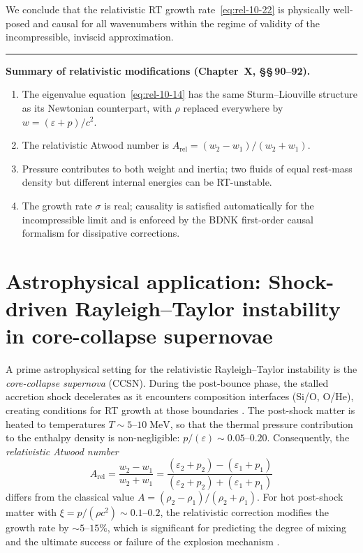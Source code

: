 We conclude that the relativistic RT growth rate~\eqref{eq:rel-10-22} is
physically well-posed and causal for all wavenumbers within the regime
of validity of the incompressible, inviscid approximation.


\begin{center}
\rule{0.5\textwidth}{0.4pt}
\end{center}

\noindent\textbf{Summary of relativistic modifications
(Chapter~X, \S\S\,90--92).}
\begin{enumerate}
\item The eigenvalue equation~\eqref{eq:rel-10-14} has the same
  Sturm--Liouville structure as its Newtonian counterpart, with $\rho$
  replaced everywhere by $w=(\varepsilon+p)/c^{2}$.
\item The relativistic Atwood number is
  $A_{\mathrm{rel}}=(w_{2}-w_{1})/(w_{2}+w_{1})$.
\item Pressure contributes to both weight and inertia; two fluids of
  equal rest-mass density but different internal energies can be
  RT-unstable.
\item The growth rate $\sigma$ is real; causality is satisfied
  automatically for the incompressible limit and is enforced by the
  BDNK first-order causal formalism for dissipative corrections.
\end{enumerate}

\section{Astrophysical application: Shock-driven Rayleigh--Taylor
instability in core-collapse supernovae}\label{sec:rel-92-astro}

A prime astrophysical setting for the relativistic Rayleigh--Taylor
instability is the \emph{core-collapse supernova} (CCSN).  During
the post-bounce phase, the stalled accretion shock decelerates
as it encounters composition interfaces (Si/O, O/He), creating
conditions for RT growth at those boundaries
\citep{Couch2015,Mueller2012}.  The post-shock matter is heated to
temperatures $T \sim 5$--$10\;\mathrm{MeV}$, so that the thermal
pressure contribution to the enthalpy density is non-negligible:
$p/(\varepsilon) \sim 0.05$--$0.20$.  Consequently, the
\emph{relativistic Atwood number}
\begin{equation}
A_{\mathrm{rel}}
= \frac{w_{2}-w_{1}}{w_{2}+w_{1}}
= \frac{(\varepsilon_{2}+p_{2})-(\varepsilon_{1}+p_{1})}
       {(\varepsilon_{2}+p_{2})+(\varepsilon_{1}+p_{1})}
\end{equation}
differs from the classical value
$A = (\rho_{2}-\rho_{1})/(\rho_{2}+\rho_{1})$.  For hot post-shock
matter with $\xi = p/(\rho c^{2}) \sim 0.1$--$0.2$, the relativistic
correction modifies the growth rate by $\sim 5$--$15\%$, which is
significant for predicting the degree of mixing and the ultimate
success or failure of the explosion mechanism
\citep{Burrows2013,Ott2013}.

